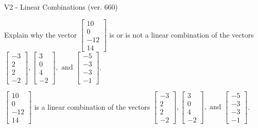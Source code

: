 \begin{exercise}
  \begin{exerciseTitle}V2 - Linear Combinations (ver. 660)\end{exerciseTitle}
  \begin{exerciseStatement}
    Explain why the vector \(\left[\begin{array}{c}
10 \\
0 \\
-12 \\
14
\end{array}\right]\)  is or is not a linear 
	combination of the vectors \(\left[\begin{array}{c}
-3 \\
2 \\
2 \\
-2
\end{array}\right] , \left[\begin{array}{c}
3 \\
0 \\
4 \\
-2
\end{array}\right] , \text{ and } \left[\begin{array}{c}
-5 \\
-3 \\
-3 \\
-1
\end{array}\right]\).
	


  \end{exerciseStatement}
  \begin{exerciseAnswer}
   \(\left[\begin{array}{c}
10 \\
0 \\
-12 \\
14
\end{array}\right]\) 
  	 is  
	a linear combination of the vectors \(\left[\begin{array}{c}
-3 \\
2 \\
2 \\
-2
\end{array}\right] , \left[\begin{array}{c}
3 \\
0 \\
4 \\
-2
\end{array}\right] , \text{ and } \left[\begin{array}{c}
-5 \\
-3 \\
-3 \\
-1
\end{array}\right]\).

	
  


  \end{exerciseAnswer}
\end{exercise}